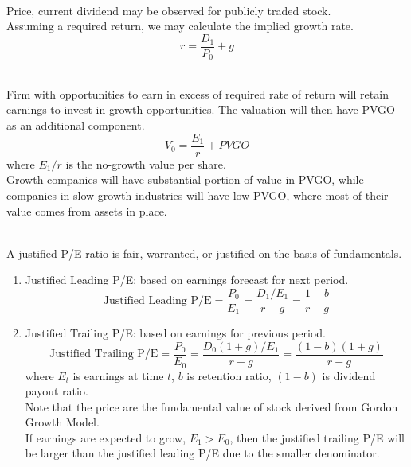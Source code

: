 \begin{remark} \\
Price, current dividend may be observed for publicly traded stock.\\
Assuming a required return, we may calculate the implied growth rate. 
\begin{equation}
r = \frac{D_1}{P_0} + g \nonumber
\end{equation}
\end{remark}

\begin{remark} \\
Firm with opportunities to earn in excess of required rate of return will retain earnings to invest in growth opportunities. The valuation will then have PVGO as an additional component.
\begin{equation}
V_0 = \frac{E_1}{r} + PVGO \nonumber
\end{equation}
where $E_1/r$ is the no-growth value per share.\\
Growth companies will have substantial portion of value in PVGO, while companies in slow-growth industries will have low PVGO, where most of their value comes from assets in place.
\end{remark}

\begin{remark} \\
A justified P/E ratio is fair, warranted, or justified on the basis of fundamentals.
\begin{enumerate}[label=\roman*.]
\setlength{\itemsep}{0pt}
\item Justified Leading P/E: based on earnings forecast for next period.
\begin{equation}
\text{Justified Leading P/E} = \frac{P_0}{E_1} = \frac{D_1/E_1}{r-g} = \frac{1-b}{r-g} \nonumber
\end{equation}
\item Justified Trailing P/E: based on earnings for previous period.
\begin{equation}
\text{Justified Trailing P/E} = \frac{P_0}{E_0} = \frac{D_0(1+g)/E_1}{r-g} = \frac{(1-b)(1+g)}{r-g} \nonumber
\end{equation}
where $E_t$ is earnings at time $t$, $b$ is retention ratio, $(1-b)$ is dividend payout ratio.\\
Note that the price are the fundamental value of stock derived from Gordon Growth Model.\\
If earnings are expected to grow, $E_1 > E_0$, then the justified trailing P/E will be larger than the justified leading P/E due to the smaller denominator.
\end{enumerate}
\end{remark}

